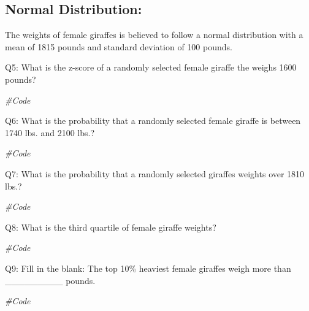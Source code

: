 \documentclass[]{article}
\newenvironment{Shaded}{\begin{snugshade}}{\end{snugshade}}
\newcommand{\CommentTok}[1]{\textcolor[rgb]{0.56,0.35,0.01}{\textit{#1}}}
\begin{document}
\newpage

\hypertarget{normal-distribution}{%
\subsection{Normal Distribution:}\label{normal-distribution}}

The weights of female giraffes is believed to follow a normal
distribution with a mean of 1815 pounds and standard deviation of 100
pounds.

Q5: What is the z-score of a randomly selected female giraffe the weighs
1600 pounds?

\begin{Shaded}
\begin{Highlighting}[]
\CommentTok{#Code}
\end{Highlighting}
\end{Shaded}

Q6: What is the probability that a randomly selected female giraffe is
between 1740 lbs. and 2100 lbs.?

\begin{Shaded}
\begin{Highlighting}[]
\CommentTok{#Code}
\end{Highlighting}
\end{Shaded}

Q7: What is the probability that a randomly selected giraffes weights
over 1810 lbs.?

\begin{Shaded}
\begin{Highlighting}[]
\CommentTok{#Code}
\end{Highlighting}
\end{Shaded}

Q8: What is the third quartile of female giraffe weights?

\begin{Shaded}
\begin{Highlighting}[]
\CommentTok{#Code}
\end{Highlighting}
\end{Shaded}

Q9: Fill in the blank: The top 10\% heaviest female giraffes weigh more
than \_\_\_\_\_\_\_\_\_ pounds.

\begin{Shaded}
\begin{Highlighting}[]
\CommentTok{#Code}
\end{Highlighting}
\end{Shaded}
\end{document}
